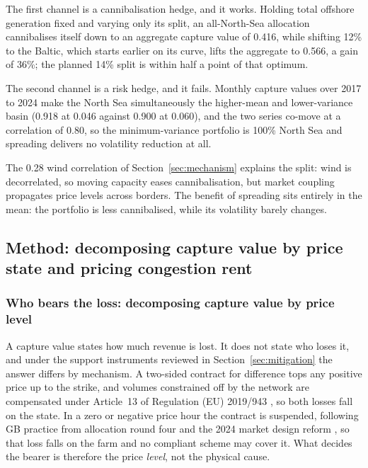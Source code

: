 The first channel is a cannibalisation hedge, and it works. Holding total
offshore generation fixed and varying only its split, an all-North-Sea
allocation cannibalises itself down to an aggregate capture value of 0.416,
while shifting 12\% to the Baltic, which starts earlier on its curve, lifts
the aggregate to 0.566, a gain of 36\%; the planned 14\% split is within
half a point of that optimum.

The second channel is a risk hedge, and it fails. Monthly capture values
over 2017 to 2024 make the North Sea simultaneously the higher-mean and
lower-variance basin (0.918 at 0.046 against 0.900 at 0.060), and the two
series co-move at a correlation of 0.80, so the minimum-variance portfolio
is 100\% North Sea and spreading delivers no volatility reduction at all.

The 0.28 wind correlation of Section~\ref{sec:mechanism} explains the split:
wind is decorrelated, so moving capacity eases cannibalisation, but market
coupling propagates price levels across borders. The benefit of spreading
sits entirely in the mean: the portfolio is less cannibalised, while its
volatility barely changes.

\subsection{Method: decomposing capture value by price state and pricing congestion rent}\label{app:whopays_method}

\subsubsection*{Who bears the loss: decomposing capture value by price
level}\label{sec:whopays_method}

A capture value states how much revenue is lost. It does not state who loses it,
and under the support instruments reviewed in
Section~\ref{sec:mitigation} the answer differs by mechanism. A two-sided
contract for difference tops any positive price up to the strike, and volumes
constrained off by the network are compensated under Article~13 of Regulation
(EU) 2019/943 \cite{EURegulation2019943}, so both losses fall on the state. In a
zero or negative price hour the contract is suspended, following GB practice from
allocation round four and the 2024 market design reform
\cite{EUMarketReform2024}, so that loss falls on the farm and no compliant
scheme may cover it. What decides the bearer is therefore the price \emph{level},
not the physical cause.


